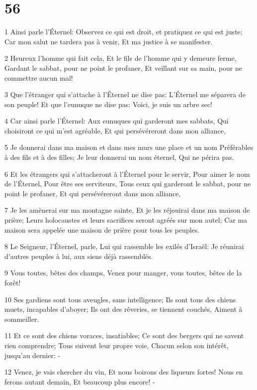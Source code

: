 \chapter{56}

\par 1 Ainsi parle l'Éternel: Observez ce qui est droit, et pratiquez ce qui est juste; Car mon salut ne tardera pas à venir, Et ma justice à se manifester.
\par 2 Heureux l'homme qui fait cela, Et le fils de l'homme qui y demeure ferme, Gardant le sabbat, pour ne point le profaner, Et veillant sur sa main, pour ne commettre aucun mal!
\par 3 Que l'étranger qui s'attache à l'Éternel ne dise pas: L'Éternel me séparera de son peuple! Et que l'eunuque ne dise pas: Voici, je suis un arbre sec!
\par 4 Car ainsi parle l'Éternel: Aux eunuques qui garderont mes sabbats, Qui choisiront ce qui m'est agréable, Et qui persévéreront dans mon alliance,
\par 5 Je donnerai dans ma maison et dans mes murs une place et un nom Préférables à des fils et à des filles; Je leur donnerai un nom éternel, Qui ne périra pas.
\par 6 Et les étrangers qui s'attacheront à l'Éternel pour le servir, Pour aimer le nom de l'Éternel, Pour être ses serviteurs, Tous ceux qui garderont le sabbat, pour ne point le profaner, Et qui persévéreront dans mon alliance,
\par 7 Je les amènerai sur ma montagne sainte, Et je les réjouirai dans ma maison de prière; Leurs holocaustes et leurs sacrifices seront agréés sur mon autel; Car ma maison sera appelée une maison de prière pour tous les peuples.
\par 8 Le Seigneur, l'Éternel, parle, Lui qui rassemble les exilés d'Israël: Je réunirai d'autres peuples à lui, aux siens déjà rassemblés.
\par 9 Vous toutes, bêtes des champs, Venez pour manger, vous toutes, bêtes de la forêt!
\par 10 Ses gardiens sont tous aveugles, sans intelligence; Ils sont tous des chiens muets, incapables d'aboyer; Ils ont des rêveries, se tiennent couchés, Aiment à sommeiller.
\par 11 Et ce sont des chiens voraces, insatiables; Ce sont des bergers qui ne savent rien comprendre; Tous suivent leur propre voie, Chacun selon son intérêt, jusqu'au dernier: -
\par 12 Venez, je vais chercher du vin, Et nous boirons des liqueurs fortes! Nous en ferons autant demain, Et beaucoup plus encore! -

